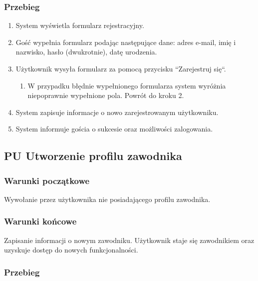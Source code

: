 \subsubsection{Przebieg}
\begin{enumerate}
  \item System wyświetla formularz rejestracyjny.
  \item Gość wypełnia formularz podając następujące dane: adres e-mail, imię i nazwisko, hasło (dwukrotnie), datę urodzenia.
  \item Użytkownik wysyła formularz za pomocą przycisku ``Zarejestruj się``.
  \begin{enumerate}[label=(\alph*)]
     \item W przypadku błędnie wypełnionego formularza system wyróżnia niepoprawnie wypełnione pola. Powrót do kroku 2.
   \end{enumerate}
  \item System zapisuje informacje o nowo zarejestrowanym użytkowniku.
  \item System informuje gościa o sukcesie oraz możliwości zalogowania.
\end{enumerate}


\subsection{PU Utworzenie profilu zawodnika}

\subsubsection{Warunki początkowe}
Wywołanie przez użytkownika nie posiadającego profilu zawodnika.

\subsubsection{Warunki końcowe}
Zapisanie informacji o nowym zawodniku. Użytkownik staje się zawodnikiem oraz uzyskuje dostęp do nowych funkcjonalności.

\subsubsection{Przebieg}

